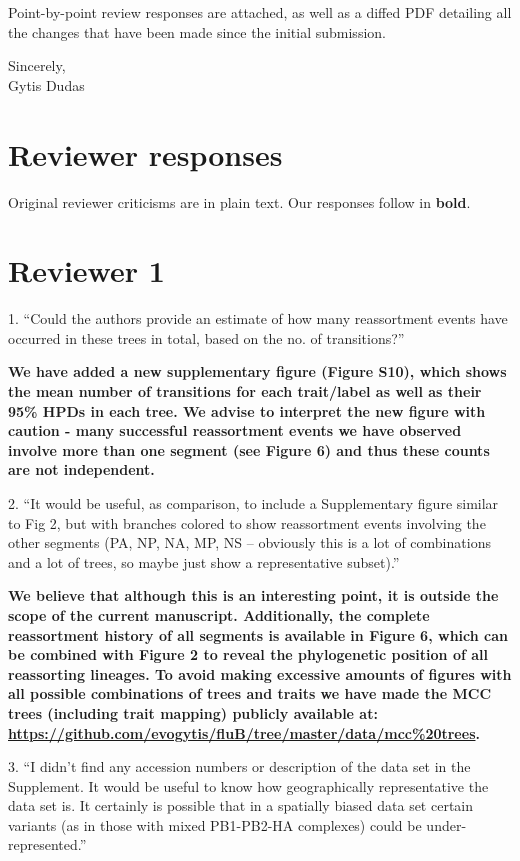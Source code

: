 \documentclass[11pt,oneside,letterpaper]{article}
\begin{document}
Point-by-point review responses are attached, as well as a diffed PDF detailing all the changes that have been made since the initial submission.

Sincerely,\\
Gytis Dudas

\restoregeometry

\newpage

\section*{Reviewer responses}

Original reviewer criticisms are in plain text.  Our responses follow in \textbf{bold}.  

\section*{Reviewer 1}
1. ``Could the authors provide an estimate of how many reassortment events have occurred in these trees in total, based on the no. of transitions?''

\textbf{We have added a new supplementary figure (Figure S10), which shows the mean number of transitions for each trait/label as well as their 95\% HPDs in each tree.
We advise to interpret the new figure with caution - many successful reassortment events we have observed involve more than one segment (see Figure 6) and thus these counts are not independent.}

2. ``It would be useful, as comparison, to include a Supplementary figure similar to Fig 2, but with branches colored to show reassortment events involving the other segments (PA, NP, NA, MP, NS -- obviously this is a lot of combinations and a lot of trees, so maybe just show a representative subset).''

\textbf{We believe that although this is an interesting point, it is outside the scope of the current manuscript.
Additionally, the complete reassortment history of all segments is available in Figure 6, which can be combined with Figure 2 to reveal the phylogenetic position of all reassorting lineages.
To avoid making excessive amounts of figures with all possible combinations of trees and traits we have made the MCC trees (including trait mapping) publicly available at: \url{https://github.com/evogytis/fluB/tree/master/data/mcc\%20trees}.}

3. ``I didn't find any accession numbers or description of the data set in the Supplement.  
It would be useful to know how geographically representative the data set is.  
It certainly is possible that in a spatially biased data set certain variants (as in those with mixed PB1-PB2-HA complexes) could be under-represented.''
\end{document}
